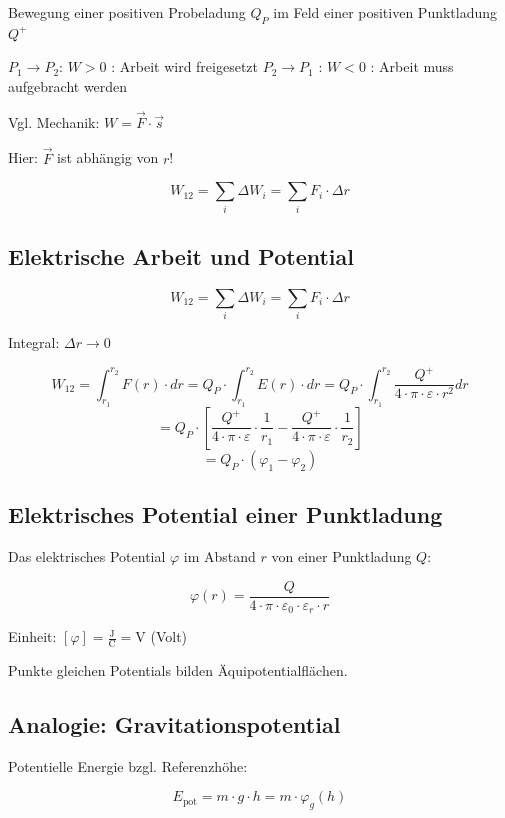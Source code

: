 \documentclass[
  11pt,
]{article}
\begin{document}
Bewegung einer positiven Probeladung \(Q_P\) im Feld einer positiven
Punktladung \(Q^+\)

\(P_1 \rightarrow P_2\): \(W > 0\) : Arbeit wird freigesetzt
\(P_2 \rightarrow P_1\) : \(W < 0\) : Arbeit muss aufgebracht werden

Vgl. Mechanik: \(W = \vec{F} \cdot \vec{s}\)

Hier: \(\vec{F}\) ist abhängig von \(r\)!

\[W_{12} = \sum_{i} \Delta W_{i} = \sum_{i} F_{i} \cdot \Delta r\]

\subsection{Elektrische Arbeit und
Potential}\label{elektrische-arbeit-und-potential}

\[W_{12} = \sum_{i} \Delta W_{i} = \sum_{i} F_{i} \cdot \Delta r\]

Integral: \(\Delta r \rightarrow 0\)

\[W_{12} = \int_{r_1}^{r_2} F(r) \cdot dr = Q_P \cdot \int_{r_1}^{r_2} E(r) \cdot dr
= Q_P \cdot \int_{r_1}^{r_2} \frac{Q^+}{4 \cdot \pi \cdot \varepsilon \cdot r^2} dr\]
\[= Q_P \cdot \left[ \frac{Q^+}{4 \cdot \pi \cdot \varepsilon} \cdot \frac{1}{r_1} - \frac{Q^+}{4 \cdot \pi \cdot \varepsilon} \cdot \frac{1}{r_2} \right]\]
\[= Q_P \cdot (\varphi_1 - \varphi_2)\]

\subsection{Elektrisches Potential einer
Punktladung}\label{elektrisches-potential-einer-punktladung}

Das elektrisches Potential \(\varphi\) im Abstand \(r\) von einer
Punktladung \(Q\):

\[\varphi(r) = \frac{Q}{4 \cdot \pi \cdot \varepsilon_0 \cdot \varepsilon_r \cdot r}\]

Einheit: \([\varphi] = \frac{\text{J}}{\text{C}} = \text{V}\) (Volt)

Punkte gleichen Potentials bilden Äquipotentialflächen.

\subsection{Analogie:
Gravitationspotential}\label{analogie-gravitationspotential}

Potentielle Energie bzgl. Referenzhöhe:

\[E_\text{pot} = m \cdot g \cdot h = m \cdot \varphi_g(h)\]
\end{document}
